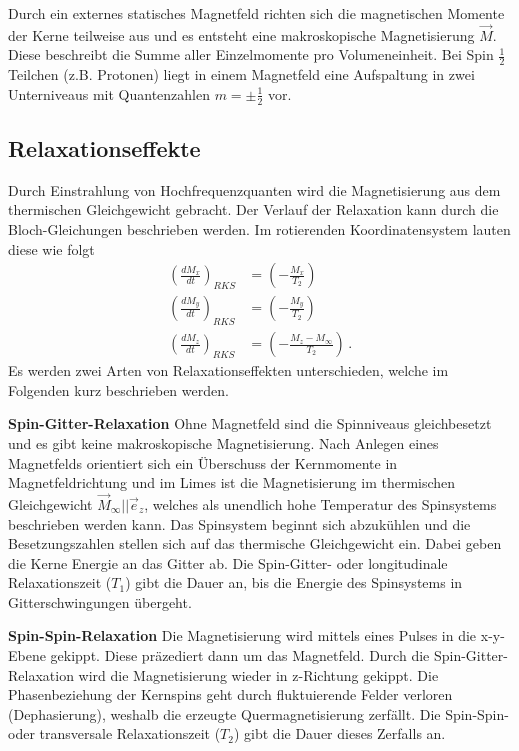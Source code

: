 Durch ein externes statisches Magnetfeld richten sich die magnetischen Momente der Kerne teilweise aus und es entsteht eine makroskopische Magnetisierung $\vec{M}$. Diese beschreibt die Summe aller Einzelmomente pro Volumeneinheit. %
Bei Spin $\frac{1}{2}$ Teilchen (z.B. Protonen) liegt in einem Magnetfeld eine Aufspaltung in zwei Unterniveaus mit Quantenzahlen $m= \pm \frac{1}{2}$ vor. %



\subsection{Relaxationseffekte}
Durch Einstrahlung von Hochfrequenzquanten wird die Magnetisierung aus dem thermischen Gleichgewicht gebracht.
Der Verlauf der Relaxation kann durch die Bloch-Gleichungen beschrieben werden. %
Im rotierenden Koordinatensystem lauten diese wie folgt %
\begin{align}
    \left( \frac{d M_x}{dt} \right)_{RKS} &= \left( - \frac{M_x}{T_2} \right) \\
    \left( \frac{d M_y}{dt} \right)_{RKS} &= \left( - \frac{M_y}{T_2} \right) \\
    \left( \frac{d M_z}{dt} \right)_{RKS} &= \left( - \frac{M_z - M_{\infty}}{T_2} \right) \, .
    \label{eq:bloch}
\end{align} 
Es werden zwei Arten von Relaxationseffekten unterschieden, welche im Folgenden kurz beschrieben werden.

\textbf{Spin-Gitter-Relaxation} \newline
Ohne Magnetfeld sind die Spinniveaus gleichbesetzt und es gibt keine makroskopische Magnetisierung. Nach Anlegen eines Magnetfelds orientiert sich ein Überschuss der Kernmomente in Magnetfeldrichtung und im Limes ist die Magnetisierung im thermischen Gleichgewicht $\vec{M}_{\infty} || \vec{e}_z$, welches als unendlich hohe Temperatur des Spinsystems beschrieben werden kann.
Das Spinsystem beginnt sich abzukühlen und die Besetzungszahlen stellen sich auf das thermische Gleichgewicht ein. Dabei geben die Kerne Energie an das Gitter ab.
Die Spin-Gitter- oder longitudinale Relaxationszeit ($T_1$) gibt die Dauer an, bis die Energie des Spinsystems in Gitterschwingungen übergeht.

\textbf{Spin-Spin-Relaxation} \newline
Die Magnetisierung wird mittels eines Pulses in die x-y-Ebene gekippt. Diese präzediert dann um das Magnetfeld. Durch die Spin-Gitter-Relaxation wird die Magnetisierung wieder in z-Richtung gekippt. Die Phasenbeziehung der Kernspins geht durch fluktuierende Felder verloren (Dephasierung), weshalb die erzeugte Quermagnetisierung zerfällt.
Die Spin-Spin- oder transversale Relaxationszeit ($T_2$) gibt die Dauer dieses Zerfalls an.

